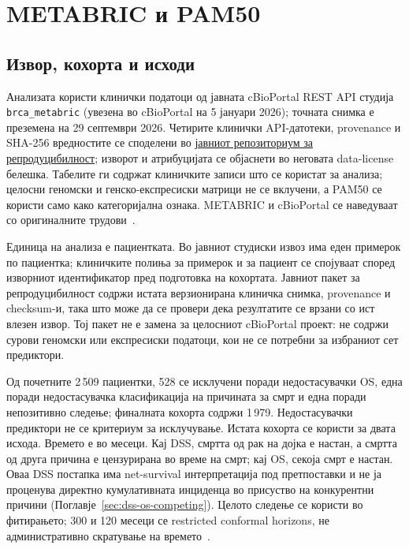 \documentclass[12pt]{article}
\begin{document}
\section{METABRIC и PAM50}

\subsection{Извор, кохорта и исходи}

Анализата користи клинички податоци од јавната cBioPortal REST API студија
\texttt{brca\_metabric} (увезена во cBioPortal на 5 јануари 2026); точната
снимка е преземена на 29 септември 2026. Четирите клинички API-датотеки,
provenance и SHA-256 вредностите се споделени во
\href{https://github.com/TheeOliver/brca-survival-uncertainty/tree/main/data/raw/cbioportal_brca_metabric}{јавниот репозиториум за репродуцибилност}; изворот и атрибуцијата се
објаснети во неговата data-license белешка.
Табелите ги содржат клиничките записи што се користат за анализа; целосни
геномски и генско-експресиски матрици не се вклучени, а PAM50 се користи само
како категоријална ознака. METABRIC и cBioPortal се наведуваат со оригиналните
трудови~\cite{curtis2012,pereira2016,rueda2019,cerami2012,gao2013}.

Единица на анализа е пациентката. Во јавниот студиски извоз има еден примерок
по пациентка; клиничките полиња за примерок и за пациент се спојуваат според
изворниот идентификатор пред подготовка на кохортата. Јавниот пакет за
репродуцибилност содржи истата верзионирана клиничка снимка, provenance и
checksum-и, така што може да се провери дека резултатите се врзани со ист влезен
извор. Тој пакет не е замена за целосниот cBioPortal проект: не содржи сурови
геномски или експресиски податоци, кои не се потребни за избраниот сет
предиктори.

Од почетните 2\,509 пациентки, 528 се исклучени поради недостасувачки OS,
една поради недостасувачка класификација на причината за смрт и една поради
непозитивно следење; финалната кохорта содржи 1\,979. Недостасувачки предиктори
не се критериум за исклучување. Истата кохорта се користи за двата исхода.
Времето е во месеци. Кај DSS, смртта од рак на дојка е настан, а смртта од
друга причина е цензурирана во време на смрт; кај OS, секоја смрт е настан.
Оваа DSS постапка има net-survival интерпретација под претпоставки и не ја
проценува директно кумулативната инциденца во присуство на конкурентни причини
(Поглавје~\ref{sec:dss-os-competing}). Целото следење се користи во фитирањето;
300 и 120 месеци се restricted conformal horizons, не административно
скратување на времето~\cite{putter2007}.
\end{document}
